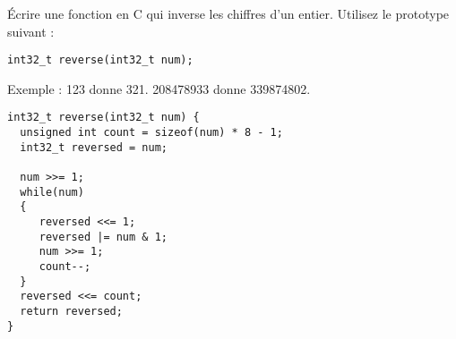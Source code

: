 \documentclass[french,a4paper,addpoints,11pt]{exam}
\begin{document}
\begin{questions}

\question Écrire une fonction en C qui inverse les chiffres d'un entier. Utilisez le prototype suivant :

\begin{lstlisting}
int32_t reverse(int32_t num);
\end{lstlisting}

Exemple : 123 donne 321. 208478933 donne 339874802.

\ifprintanswers
\begin{solution}
\begin{lstlisting}
int32_t reverse(int32_t num) {
  unsigned int count = sizeof(num) * 8 - 1;
  int32_t reversed = num;

  num >>= 1;
  while(num)
  {
     reversed <<= 1;
     reversed |= num & 1;
     num >>= 1;
     count--;
  }
  reversed <<= count;
  return reversed;
}
\end{lstlisting}
\end{solution}
\else
\fillwithdottedlines{10cm}
\fi


\end{questions}
\end{document}
